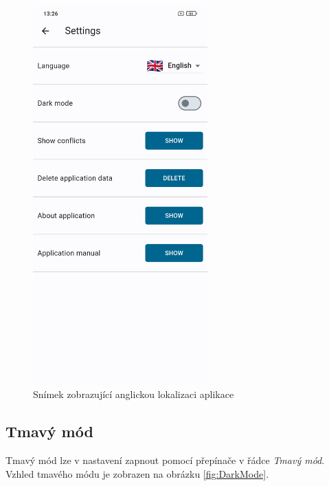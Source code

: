 \documentclass[czech, bc, kiv, he, iso690numb]{fasthesis}
\begin{document}
\begin{figure}[h!]
  \centering
  \includegraphics[width=0.6\textwidth]{img/BP-Runt/UserManual/Language.jpg}
  \caption{Snímek zobrazující anglickou lokalizaci aplikace}
  \label{fig:language}
\end{figure}

\subsection{Tmavý mód}

Tmavý mód lze v nastavení zapnout pomocí přepínače v řádce \textit{Tmavý mód}. Vzhled tmavého módu je zobrazen na obrázku \ref{fig:DarkMode}.
\end{document}
